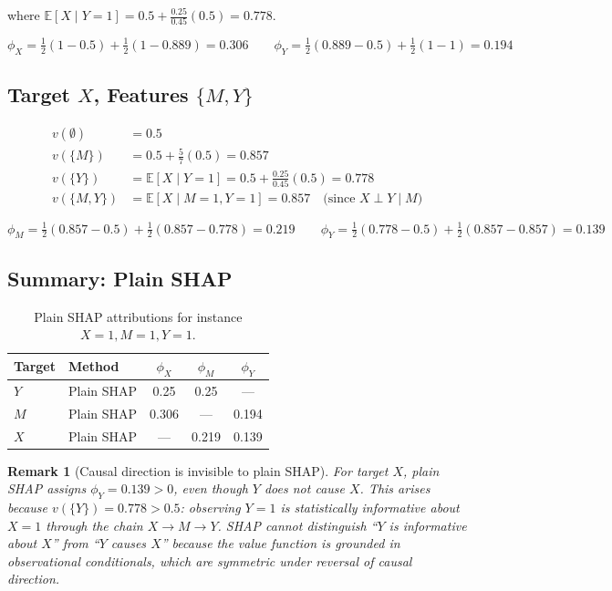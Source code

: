 \documentclass[12pt]{article}
\newtheorem{remark}{Remark}
\begin{document}
where $\mathbb{E}[X \mid Y=1] = 0.5 + \frac{0.25}{0.45}(0.5) = 0.778$.

\begin{equation}
\phi_X = \tfrac{1}{2}(1-0.5) + \tfrac{1}{2}(1-0.889) = 0.306
\qquad
\phi_Y = \tfrac{1}{2}(0.889-0.5) + \tfrac{1}{2}(1-1) = 0.194
\end{equation}

\subsection{Target $X$, Features $\{M, Y\}$}

\begin{align}
v(\emptyset) &= 0.5 \\
v(\{M\}) &= 0.5 + \tfrac{5}{7}(0.5) = 0.857 \\
v(\{Y\}) &= \mathbb{E}[X \mid Y=1] = 0.5 + \tfrac{0.25}{0.45}(0.5) = 0.778 \\
v(\{M,Y\}) &= \mathbb{E}[X \mid M=1, Y=1] = 0.857 \quad \text{(since $X \perp Y \mid M$)}
\end{align}

\begin{equation}
\phi_M = \tfrac{1}{2}(0.857-0.5) + \tfrac{1}{2}(0.857-0.778) = 0.219
\qquad
\phi_Y = \tfrac{1}{2}(0.778-0.5) + \tfrac{1}{2}(0.857-0.857) = 0.139
\end{equation}

\subsection{Summary: Plain SHAP}

\begin{table}[h]
\centering
\begin{tabular}{llccc}
\toprule
Target & Method & $\phi_X$ & $\phi_M$ & $\phi_Y$ \\
\midrule
$Y$ & Plain SHAP & 0.25  & 0.25  & ---   \\
$M$ & Plain SHAP & 0.306 & ---   & 0.194 \\
$X$ & Plain SHAP & ---   & 0.219 & 0.139 \\
\bottomrule
\end{tabular}
\caption{Plain SHAP attributions for instance $X=1, M=1, Y=1$.}
\end{table}

\begin{remark}[Causal direction is invisible to plain SHAP]
For target $X$, plain SHAP assigns $\phi_Y = 0.139 > 0$, even though $Y$ does not cause $X$.
This arises because $v(\{Y\}) = 0.778 > 0.5$: observing $Y=1$ is statistically informative
about $X=1$ through the chain $X \to M \to Y$. SHAP cannot distinguish ``$Y$ is informative
about $X$'' from ``$Y$ causes $X$'' because the value function is grounded in observational
conditionals, which are symmetric under reversal of causal direction.
\end{remark}
\end{document}
